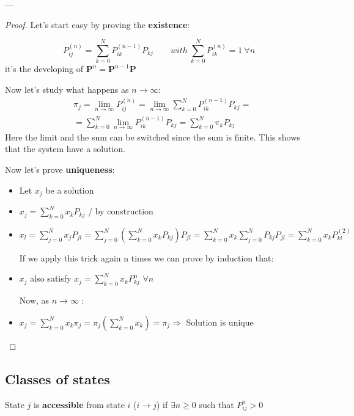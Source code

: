 ---
\begin{proof} Let's start easy by proving the \textbf{existence}:

\begin{equation}
  P_{i j}^{(n)} = \sum_{k=0}^N P_{ik}^{(n-1)} P_{k j}
	\qquad with ~\sum_{k=0}^N P_{ik}^{(n)} = 1 ~\forall n
\end{equation}
it's the developing of $\bm P^n = \bm P^{n-1} \bm P$

Now let's study what happens as $ n \to \infty $:
\begin{equation}
\begin{split}
	&\pi_j = \lim_{n \to \infty} P_{ij}^{(n)} = \lim_{n \to \infty} \sum_{k=0}^N P_{ik}^{(n-1)} P_{k j
	} =\\
	&= \sum_{k=0}^N \lim_{n \to \infty} P_{ik}^{(n-1)} P_{k j
	} = \sum_{k=0}^N \pi_k P_{kj}
\end{split}
\end{equation}
Here the limit and the sum can be switched since the sum is finite.
This shows that the system have a solution.

Now let's prove \textbf{uniqueness}:


\begin{itemize}

\item Let $x_j$ be a solution
\item $x_j = \sum_{k=0}^N x_k P_{kj} $ / by construction
\item $x_l = \sum_{j=0}^N x_j P_{jl} =  \sum_{j=0}^N ( \sum_{k=0}^N x_k P_{kj} ) P_{jl} =  \sum_{k=0}^N x_k \sum_{j=0}^N P_{kj} P_{jl} = \sum_{k=0}^N x_k P_{kl}^{(2)}$

If we apply this trick again n times we can prove by induction  that:

\item $x_j$ also satisfy $ x_j = \sum_{k=0}^N x_k P_{kj}^n $ \quad  $\forall n $

Now, as $n \to \infty$ :

\item  $x_j = \sum_{k=0}^N x_k \pi_j = \pi_j (\sum_{k=0}^N x_k) = \pi_j  \Rightarrow $ Solution is unique

\end{itemize}

\end{proof}

\subsection{Classes of states}
\begin{definition}

State $j$ is {\bfseries accessible} from state $i$ ($i \rightarrow j$) if $\exists n \geq 0$ such that $P_{ij}^n > 0$
\end{definition}

